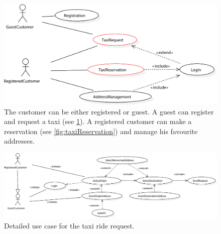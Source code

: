 \begin{figure}%
	\includegraphics[width=\textwidth]{img/U_CustomerManagementGLOBAL}%
	\caption{The customer can be either registered or guest. A guest can register and request a taxi (see \protect\cref{fig:taxiRequest}). A registered customer can make a reservation (see \protect\cref{fig:taxiReservation}) and manage his favourite addresses.}%
\end{figure}

\begin{figure}%
	\includegraphics[width=\textwidth]{img/U_TaxiRequest.pdf}%
	\caption{Detailed use case for the taxi ride request.}%
	\label{fig:taxiRequest}%
\end{figure}	

